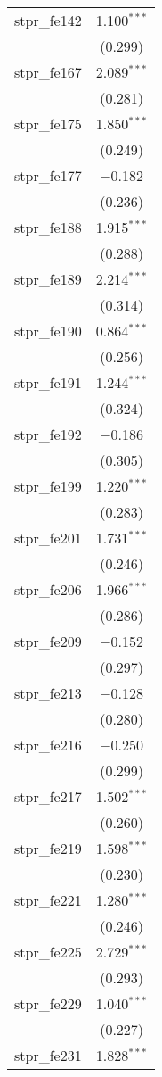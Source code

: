\begin{table}[!htbp]
\begin{tabular}{@{\extracolsep{5pt}}lc}
  stpr\_fe142 & 1.100$^{***}$ \\ 
  & (0.299) \\ 
  stpr\_fe167 & 2.089$^{***}$ \\ 
  & (0.281) \\ 
  stpr\_fe175 & 1.850$^{***}$ \\ 
  & (0.249) \\ 
  stpr\_fe177 & $-$0.182 \\ 
  & (0.236) \\ 
  stpr\_fe188 & 1.915$^{***}$ \\ 
  & (0.288) \\ 
  stpr\_fe189 & 2.214$^{***}$ \\ 
  & (0.314) \\ 
  stpr\_fe190 & 0.864$^{***}$ \\ 
  & (0.256) \\ 
  stpr\_fe191 & 1.244$^{***}$ \\ 
  & (0.324) \\ 
  stpr\_fe192 & $-$0.186 \\ 
  & (0.305) \\ 
  stpr\_fe199 & 1.220$^{***}$ \\ 
  & (0.283) \\ 
  stpr\_fe201 & 1.731$^{***}$ \\ 
  & (0.246) \\ 
  stpr\_fe206 & 1.966$^{***}$ \\ 
  & (0.286) \\ 
  stpr\_fe209 & $-$0.152 \\ 
  & (0.297) \\ 
  stpr\_fe213 & $-$0.128 \\ 
  & (0.280) \\ 
  stpr\_fe216 & $-$0.250 \\ 
  & (0.299) \\ 
  stpr\_fe217 & 1.502$^{***}$ \\ 
  & (0.260) \\ 
  stpr\_fe219 & 1.598$^{***}$ \\ 
  & (0.230) \\ 
  stpr\_fe221 & 1.280$^{***}$ \\ 
  & (0.246) \\ 
  stpr\_fe225 & 2.729$^{***}$ \\ 
  & (0.293) \\ 
  stpr\_fe229 & 1.040$^{***}$ \\ 
  & (0.227) \\ 
  stpr\_fe231 & 1.828$^{***}$ \\ 

\end{tabular}
\end{table}
